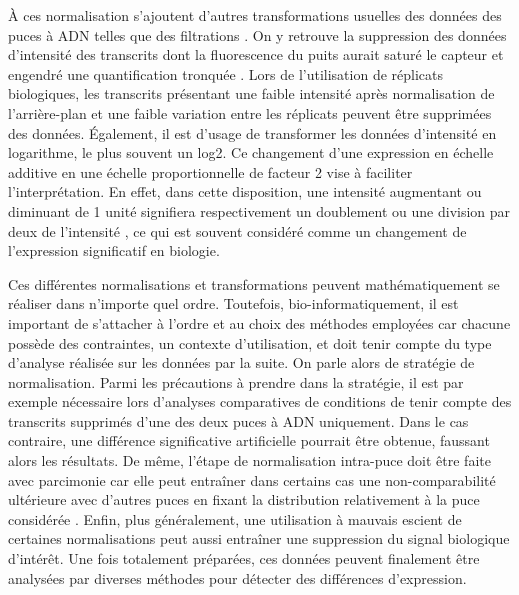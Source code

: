 À ces normalisation s'ajoutent d'autres transformations usuelles des données des puces à ADN telles que des filtrations \cite{Quackenbush2002Dec}. On y retrouve la suppression des données d'intensité des transcrits dont la fluorescence du puits aurait saturé le capteur et engendré une quantification tronquée \cite{Wilkes2007Apr}. Lors de l'utilisation de réplicats biologiques, les transcrits présentant une faible intensité après normalisation de l'arrière-plan et une faible variation entre les réplicats peuvent être supprimées des données. Également, il est d'usage de transformer les données d'intensité en logarithme, le plus souvent un log2. Ce changement d'une expression en échelle additive en une échelle proportionnelle de facteur 2 vise à faciliter l'interprétation. En effet, dans cette disposition, une intensité augmentant ou diminuant de 1 unité signifiera respectivement un doublement ou une division par deux de l'intensité \cite{Smyth2003Dec}, ce qui est souvent considéré comme un changement de l'expression significatif en biologie. 

Ces différentes normalisations et transformations peuvent mathématiquement se réaliser dans n'importe quel ordre. Toutefois, bio-informatiquement, il est important de s'attacher à l'ordre et au choix des méthodes employées car chacune possède des contraintes, un contexte d'utilisation, et doit tenir compte du type d'analyse réalisée sur les données par la suite. On parle alors de stratégie de normalisation. Parmi les précautions à prendre dans la stratégie, il est par exemple nécessaire lors d'analyses comparatives de conditions de tenir compte des transcrits supprimés d'une des deux puces à ADN uniquement. Dans le cas contraire, une différence significative artificielle pourrait être obtenue, faussant alors les résultats. De même, l'étape de normalisation intra-puce doit être faite avec parcimonie car elle peut entraîner dans certains cas une non-comparabilité ultérieure avec d'autres puces en fixant la distribution relativement à la puce considérée \cite{Argyropoulos2006Apr}. Enfin, plus généralement, une utilisation à mauvais escient de certaines normalisations peut aussi entraîner une suppression du signal biologique d'intérêt. Une fois totalement préparées, ces données peuvent finalement être analysées par diverses méthodes pour détecter des différences d'expression.



